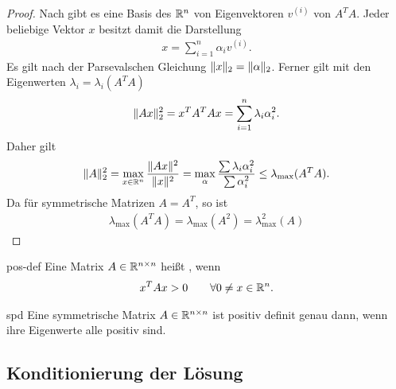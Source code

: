 \begin{proof}
  Nach  gibt es eine Basis des $\mathbb R^n$ von
  Eigenvektoren $v^{(i)}$ von $A^TA$. Jeder beliebige Vektor $x$
  besitzt damit die Darstellung
  \begin{gather}
    x = \sum_{i=1}^n \alpha_i v^{(i)}.
  \end{gather}
  Es gilt nach der Parsevalschen Gleichung
  $\lVert x\rVert_2 = \lVert\alpha\rVert_2$. Ferner gilt mit den Eigenwerten
  $\lambda_i = \lambda_i(A^TA)$
  \begin{gather}
    \lVert Ax\rVert_2^2 = x^TA^TAx = \sum_{i=1}^n \lambda_i \alpha_i^2.
  \end{gather}
  Daher gilt
  \begin{gather}
    \lVert A\rVert_2^2 = \max_{x\in \mathbb R^n} \frac{\lVert Ax\rVert^2}{\lVert x\rVert^2}
    = \max_{\alpha} \frac{\sum \lambda_i\alpha_i^2}{\sum\alpha_i^2}
    \le \lambda_{\max}(A^TA).
  \end{gather}
  Da für symmetrische Matrizen $A=A^T$, so ist
  \begin{gather}
    \lambda_{\max}(A^TA) = \lambda_{\max}(A^2) = \lambda_{\max}^2(A)
  \end{gather}
\end{proof}

\begin{Definition}{pos-def}
  Eine Matrix $A\in\mathbb R^{n\times n}$ heißt , wenn
  \begin{gather}
    x^TAx > 0 \qquad\forall 0\neq x\in \mathbb R^n.
  \end{gather}
\end{Definition}

\begin{Satz}{spd}
  Eine symmetrische Matrix $A\in\mathbb R^{n\times n}$ ist positiv definit genau dann, wenn ihre Eigenwerte alle positiv sind.
\end{Satz}

\subsection{Konditionierung der Lösung}

